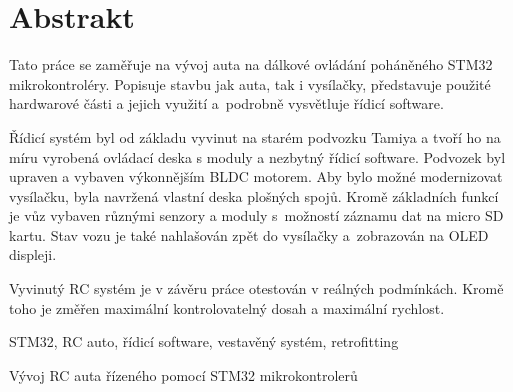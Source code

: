 \section*{Abstrakt}
\vspace{0.5cm}

Tato práce se zaměřuje na vývoj auta na dálkové ovládání poháněného STM32 mikrokontroléry. Popisuje stavbu jak auta, tak i vysílačky, představuje použité hardwarové části a jejich využití a~podrobně vysvětluje řídicí software.

Řídicí systém byl od základu vyvinut na starém podvozku Tamiya a tvoří ho na míru vyrobená ovládací deska s moduly a nezbytný řídicí software. Podvozek byl upraven a vybaven výkonnějším BLDC motorem. Aby bylo možné modernizovat vysílačku, byla navržená vlastní deska plošných spojů. Kromě základních funkcí je vůz vybaven různými senzory a moduly s~možností záznamu dat na micro SD kartu. Stav vozu je také nahlašován zpět do vysílačky a~zobrazován na OLED displeji.

Vyvinutý RC systém je v závěru práce otestován v reálných podmínkách. Kromě toho je změřen maximální kontrolovatelný dosah a maximální rychlost.

\vspace{1cm}
 STM32, RC auto, řídicí software, vestavěný systém, retrofitting

 Vývoj RC auta řízeného pomocí STM32 mikrokontrolerů
